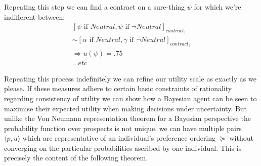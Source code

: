 \documentclass{tufte-handout}
\begin{document}
Repeating this step we can find a contract on a sure-thing $\psi$ for which we're indifferent between:
\begin{equation} 
\begin{split}
[\psi \text{ if } Neutral, \psi \text{ if } \neg Neutral]_{contract_1}  \\
 \sim   [\alpha \text{ if } Neutral, \gamma \text{ if } \neg Neutral ]_{contract_2} \\
  \Rightarrow u(\psi) = .75
   \\ . . . etc
 \end{split}
\end{equation}

Repeating this process indefinitely we can refine our utility scale as exactly as we please. If these measures adhere to certain basic constraints of rationality regarding consistency of utility we can show how a Bayesian agent can be seen to maximise their expected utility when making decisions under uncertainty. But unlike the Von Neumann representation theorem for a Bayesian perspective the probability function over prospects is not unique, we can have multiple pairs $\langle p, u \rangle$ which are representative of an individual's preference ordering $\succeq$ without converging on the particular probabilities ascribed by one individual. This is precisely the content of the following theorem. 
\end{document}
